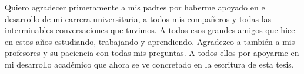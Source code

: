 \documentclass[../Main.tex]{subfiles}
\begin{document}
Quiero agradecer primeramente a mis padres por haberme apoyado en el desarrollo de mi carrera universitaria, a todos mis compañeros y todas las interminables conversaciones que tuvimos. A todos esos grandes amigos que hice en estos años estudiando, trabajando y aprendiendo. Agradezco a también a mis profesores y su paciencia con todas mis preguntas. A todos ellos por apoyarme en mi desarrollo académico que ahora se ve concretado en la escritura de esta tesis.

\vspace*{2\baselineskip}


\vspace*{3\baselineskip}
\end{document}
